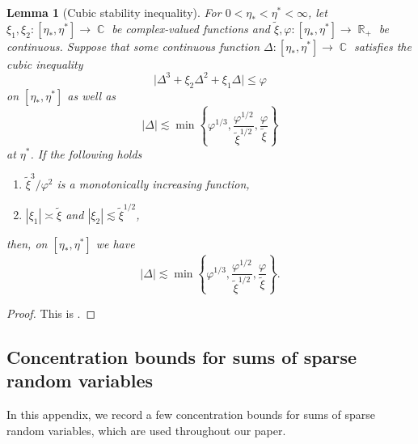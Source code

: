 \documentclass[11pt]{article}
\DeclareMathOperator{\RR}{\mathbb{R}}
\DeclareMathOperator{\CC}{\mathbb{C}}
\newcommand{\abs}[1]{\left| #1 \right|}
\theoremstyle{plain}
\newtheorem{lemma}{Lemma}[section]
\theoremstyle{remark}
\numberwithin{equation}{section}
\begin{document}
	\begin{lemma}[Cubic stability inequality]\label{lem:stability2}
		For $0 < \eta_{\ast} < \eta^{\ast} < \infty$, let $\xi_1, \xi_2 : [\eta_{\ast}, \eta^{\ast}] \rightarrow \CC$ be complex-valued functions and $\tilde{\xi},\varphi: [\eta_{\ast},\eta^{\ast}] \rightarrow \RR_{+}$ be continuous. Suppose that some continuous function $\Delta : [\eta_{\ast}, \eta^{\ast}] \rightarrow \CC$ satisfies the cubic inequality 
		\begin{equation*}
			\big| \Delta^3 + \xi_2 \Delta^2 + \xi_1 \Delta \big| \le \varphi 
		\end{equation*}
		on $[\eta_{\ast}, \eta^{\ast}]$ as well as 
		\begin{equation*}
			\abs{\Delta} \lesssim \min \left\{ \varphi^{1/3}, \frac{\varphi^{1/2}}{\tilde{\xi}^{1/2}}, \frac{\varphi}{\tilde{\xi}}\right\}
		\end{equation*}
		at $\eta^{\ast}$. If the following holds
		\begin{enumerate}
			\item $\tilde{\xi}^3/\varphi^{2}$ is a monotonically increasing function,
			\item $|\xi_1| \asymp \tilde{\xi}$ and $|\xi_2| \lesssim \tilde{\xi}^{1/2}$,
		\end{enumerate}
		then, on $[\eta_{\ast}, \eta^{\ast}]$ we have 
		\begin{equation*}
			\abs{\Delta} \lesssim  \min\left\{ \varphi^{1/3}, \frac{\varphi^{1/2}}{\tilde{\xi}^{1/2}}, \frac{\varphi}{\tilde{\xi}}\right\}.
		\end{equation*}
	\end{lemma}
	
	\begin{proof} 
	This is {\cite[Lemma~10.3]{e643140142d24edcbb5c1a963fc669bf}}. 
	\end{proof} 
	
	\subsection{Concentration bounds for sums of sparse random variables}
	In this appendix, we record a few concentration bounds for sums of sparse random variables, which are used throughout our paper. 
	
\end{document}
